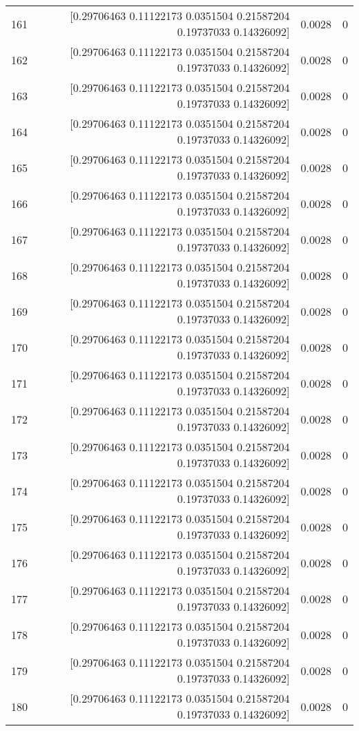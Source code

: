\begin{longtable}{lrrr}
161 & [0.29706463 0.11122173 0.0351504  0.21587204 0.19737033 0.14326092] & 0.0028 & 0 \\
162 & [0.29706463 0.11122173 0.0351504  0.21587204 0.19737033 0.14326092] & 0.0028 & 0 \\
163 & [0.29706463 0.11122173 0.0351504  0.21587204 0.19737033 0.14326092] & 0.0028 & 0 \\
164 & [0.29706463 0.11122173 0.0351504  0.21587204 0.19737033 0.14326092] & 0.0028 & 0 \\
165 & [0.29706463 0.11122173 0.0351504  0.21587204 0.19737033 0.14326092] & 0.0028 & 0 \\
166 & [0.29706463 0.11122173 0.0351504  0.21587204 0.19737033 0.14326092] & 0.0028 & 0 \\
167 & [0.29706463 0.11122173 0.0351504  0.21587204 0.19737033 0.14326092] & 0.0028 & 0 \\
168 & [0.29706463 0.11122173 0.0351504  0.21587204 0.19737033 0.14326092] & 0.0028 & 0 \\
169 & [0.29706463 0.11122173 0.0351504  0.21587204 0.19737033 0.14326092] & 0.0028 & 0 \\
170 & [0.29706463 0.11122173 0.0351504  0.21587204 0.19737033 0.14326092] & 0.0028 & 0 \\
171 & [0.29706463 0.11122173 0.0351504  0.21587204 0.19737033 0.14326092] & 0.0028 & 0 \\
172 & [0.29706463 0.11122173 0.0351504  0.21587204 0.19737033 0.14326092] & 0.0028 & 0 \\
173 & [0.29706463 0.11122173 0.0351504  0.21587204 0.19737033 0.14326092] & 0.0028 & 0 \\
174 & [0.29706463 0.11122173 0.0351504  0.21587204 0.19737033 0.14326092] & 0.0028 & 0 \\
175 & [0.29706463 0.11122173 0.0351504  0.21587204 0.19737033 0.14326092] & 0.0028 & 0 \\
176 & [0.29706463 0.11122173 0.0351504  0.21587204 0.19737033 0.14326092] & 0.0028 & 0 \\
177 & [0.29706463 0.11122173 0.0351504  0.21587204 0.19737033 0.14326092] & 0.0028 & 0 \\
178 & [0.29706463 0.11122173 0.0351504  0.21587204 0.19737033 0.14326092] & 0.0028 & 0 \\
179 & [0.29706463 0.11122173 0.0351504  0.21587204 0.19737033 0.14326092] & 0.0028 & 0 \\
180 & [0.29706463 0.11122173 0.0351504  0.21587204 0.19737033 0.14326092] & 0.0028 & 0 \\

\end{longtable}
